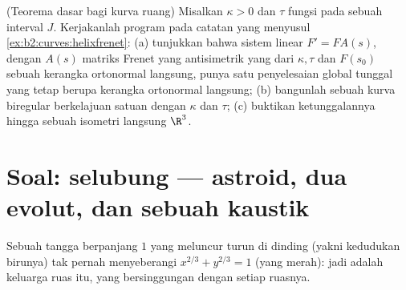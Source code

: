 \begin{exercise}[$\star\star\star$]\label{exo:b2:curves:12}
(Teorema dasar bagi kurva ruang) Misalkan $\kappa > 0$ dan
$\tau$ fungsi  pada sebuah interval $J$. Kerjakanlah
program pada catatan yang menyusul
\cref{ex:b2:curves:helixfrenet}: (a) tunjukkan bahwa sistem
linear $F' = FA(s)$, dengan $A(s)$ matriks Frenet yang
antisimetrik yang  dari $\kappa, \tau$ dan $F(s_0)$ sebuah
kerangka ortonormal langsung, punya satu penyelesaian global tunggal yang tetap
berupa kerangka ortonormal langsung; (b) bangunlah sebuah kurva biregular
berkelajuan satuan dengan  $\kappa$ dan  $\tau$;
(c) buktikan ketunggalannya hingga sebuah isometri langsung $\R^3$.
\end{exercise}

\section{Soal: selubung --- astroid, dua evolut, dan
sebuah kaustik}

\begin{omfigure}

{\small Sebuah tangga berpanjang $1$ yang meluncur turun di dinding (yakni
kedudukan birunya) tak pernah menyeberangi  $x^{2/3} + y^{2/3} = 1$
(yang merah): jadi  adalah \emph{} keluarga
ruas itu, yang bersinggungan dengan setiap ruasnya.}
\end{omfigure}

